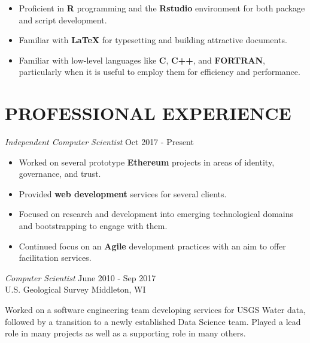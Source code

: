 \documentclass[line,margin]{res}
\begin{document}
\begin{resume}
\begin{itemize}
	\item Proficient in \textbf{R} programming and the \textbf{Rstudio} environment for both package and script development.
	\item Familiar with \textbf{\LaTeX} for typesetting and building attractive documents.
	\item Familiar with low-level languages like \textbf{C}, \textbf{C++}, and \textbf{FORTRAN}, particularly when it is useful to employ them for efficiency and performance.
\end{itemize}
 
\section{PROFESSIONAL EXPERIENCE}
	{\sl Independent Computer Scientist} \hfill Oct 2017 - Present \\
	\begin{itemize} \itemsep -2pt %
		\item Worked on several prototype \textbf{Ethereum} projects in areas of identity, governance, and trust.
		\item Provided \textbf{web development} services for several clients.
		\item Focused on research and development into emerging technological domains and bootstrapping to engage with them.
		\item Continued focus on an \textbf{Agile} development practices with an aim to offer facilitation services.
	\end{itemize}

	{\sl Computer Scientist} \hfill June 2010 - Sep 2017 \\
	U.S. Geological Survey \hfill Middleton, WI

	Worked on a software engineering team developing services for USGS Water data, followed by a transition to a newly established Data Science team.  Played a lead role in many projects as well as a supporting role in many others. 


\end{resume}
\end{document}
